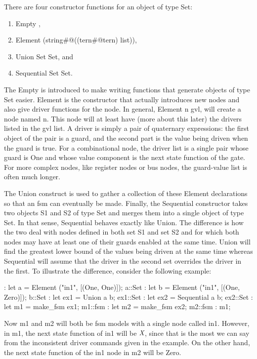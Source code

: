 There are four constructor functions for an object of type Set:
\begin{enumerate}
\item
Empty%
%
{},
\item
Element%
%
{} (string\verb@#@((tern\verb@#@tern) list)),
\item
Union%
%
{} Set Set, and
\item
Sequential%
%
{} Set Set.
\end{enumerate}
The Empty is introduced to make writing functions that generate
objects of type Set easier.
Element is the constructor that actually introduces new nodes and
also give driver functions for the node.
In general, Element n gvl, will create a node named n.
This node will at least have (more about this later) the drivers
listed in the gvl list.
A driver is simply a pair of quaternary expressions:
the first object of the pair is a guard, and the second part
is the value being driven when the guard is true.
For a combinational node, the driver list is a single pair whose
guard is One and whose value component is the next state function
of the gate.
For more complex nodes, like register nodes or bus nodes, the guard-value
list is often much longer.

The Union construct is used to gather a collection of these Element
declarations so that an fsm can eventually be made.
Finally, the Sequential constructor takes two objects S1 and S2 of
type Set and merges them into a single object of type Set.
In that sense, Sequential behaves exactly like Union.
The difference is how the two deal with nodes defined in both set S1 and set S2
and for which both nodes may have at least one of their guards enabled
at the same time.
Union will find the greatest lower bound of the values being driven
at the same time whereas Sequential will assume that the driver in the
second set overrides the driver in the first.
To illustrate the difference, consider the following example:
\begin{hol}
: let a = Element ("in1", [(One, One)]);
a::Set
: let b = Element ("in1", [(One, Zero)]);
b::Set
: let ex1 = Union a b;
ex1::Set
: let ex2 = Sequential a b;
ex2::Set
: let m1 = make\_fsm ex1;
m1::fsm
: let m2 = make\_fsm ex2;
m2::fsm
: m1;
\end{hol}
Now m1 and m2 will both be fsm models with a single node called in1.
However, in m1, the next state function of in1 will be $\mbox{\em X}$, since that
is the most we can say from the inconsistent driver commands given
in the example.
On the other hand, the next state function of the in1 node in m2 will be Zero.

